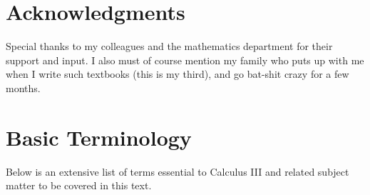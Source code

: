 \section*{Acknowledgments}
Special thanks to my colleagues and the mathematics department for their support and input. I also must of course mention my family who puts up with me when I write such textbooks (this is my third), and go bat-shit crazy for a few months.

\section*{Basic Terminology} 

Below is an extensive list of terms essential to Calculus III and related subject matter to be covered in this text.

